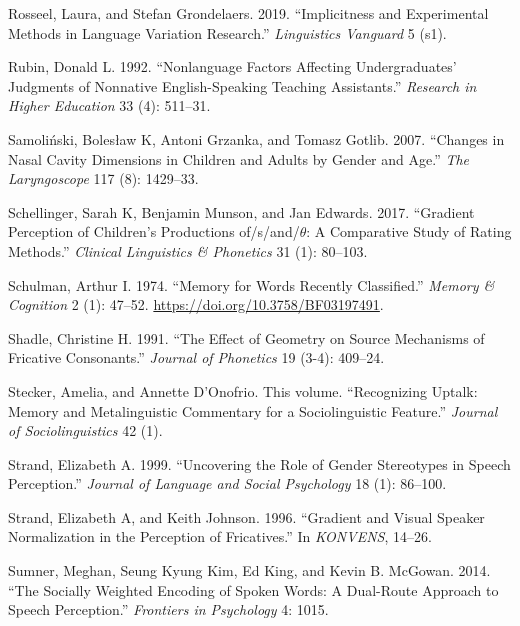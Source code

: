 \documentclass[
  letterpaper,
  DIV=11,
  numbers=noendperiod]{scrartcl}
\newlength{\cslhangindent}
\newenvironment{CSLReferences}[2] %
 {\begin{list}{}{%
  \setlength{\itemindent}{0pt}
  \setlength{\leftmargin}{0pt}
  \setlength{\parsep}{0pt}
  \ifodd #1
   \setlength{\leftmargin}{\cslhangindent}
   \setlength{\itemindent}{-1\cslhangindent}
  \fi
  \setlength{\itemsep}{#2\baselineskip}}}
 {\end{list}}
\begin{document}
\begin{CSLReferences}{1}{0}
Rosseel, Laura, and Stefan Grondelaers. 2019. {``Implicitness and
Experimental Methods in Language Variation Research.''}
\emph{Linguistics Vanguard} 5 (s1).

Rubin, Donald L. 1992. {``Nonlanguage Factors Affecting Undergraduates'
Judgments of Nonnative English-Speaking Teaching Assistants.''}
\emph{Research in Higher Education} 33 (4): 511--31.

Samoliński, Bolesław K, Antoni Grzanka, and Tomasz Gotlib. 2007.
{``Changes in Nasal Cavity Dimensions in Children and Adults by Gender
and Age.''} \emph{The Laryngoscope} 117 (8): 1429--33.

Schellinger, Sarah K, Benjamin Munson, and Jan Edwards. 2017.
{``Gradient Perception of Children's Productions of/s/and/\(\theta\): A
Comparative Study of Rating Methods.''} \emph{Clinical Linguistics \&
Phonetics} 31 (1): 80--103.

Schulman, Arthur I. 1974. {``Memory for Words Recently Classified.''}
\emph{Memory \& Cognition} 2 (1): 47--52.
\url{https://doi.org/10.3758/BF03197491}.

Shadle, Christine H. 1991. {``The Effect of Geometry on Source
Mechanisms of Fricative Consonants.''} \emph{Journal of Phonetics} 19
(3-4): 409--24.

Stecker, Amelia, and Annette D'Onofrio. This volume. {``Recognizing
Uptalk: Memory and Metalinguistic Commentary for a Sociolinguistic
Feature.''} \emph{Journal of Sociolinguistics} 42 (1).

Strand, Elizabeth A. 1999. {``Uncovering the Role of Gender Stereotypes
in Speech Perception.''} \emph{Journal of Language and Social
Psychology} 18 (1): 86--100.

Strand, Elizabeth A, and Keith Johnson. 1996. {``Gradient and Visual
Speaker Normalization in the Perception of Fricatives.''} In
\emph{KONVENS}, 14--26.

Sumner, Meghan, Seung Kyung Kim, Ed King, and Kevin B. McGowan. 2014.
{``The Socially Weighted Encoding of Spoken Words: A Dual-Route Approach
to Speech Perception.''} \emph{Frontiers in Psychology} 4: 1015.


\end{CSLReferences}
\end{document}
